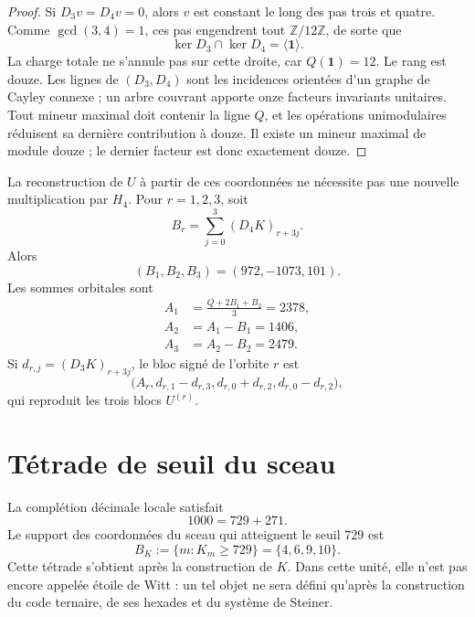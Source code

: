 \begin{proof}
Si \(D_3v=D_4v=0\), alors \(v\) est constant le long des pas
trois et quatre. Comme \(\gcd(3,4)=1\), ces pas engendrent tout
\(\mathbb Z/12\mathbb Z\), de sorte que
\[
 \ker D_3\cap\ker D_4=\langle\mathbf1\rangle.
\]
La charge totale ne s’annule pas sur cette droite, car \(Q(\mathbf1)=12\). Le rang
est douze. Les lignes de \((D_3,D_4)\) sont les incidences orientées d’un graphe
de Cayley connexe ; un arbre couvrant apporte onze facteurs invariants
unitaires. Tout mineur maximal doit contenir la ligne \(Q\), et les opérations
unimodulaires réduisent sa dernière contribution à douze. Il existe un mineur maximal de
module douze ; le dernier facteur est donc exactement douze.
\end{proof}

La reconstruction de \(U\) à partir de ces coordonnées ne nécessite pas une nouvelle multiplication par \(H_4\). Pour \(r=1,2,3\), soit
\begin{equation}
 B_r=\sum_{j=0}^{3}(D_4K)_{r+3j}.
 \label{eq:br-diferencias-k}
\end{equation}
Alors
\[
 (B_1,B_2,B_3)=(972,-1073,101).
\]
Les sommes orbitales sont
\begin{align}
 A_1&=\frac{Q+2B_1+B_2}{3}=2378,
 \label{eq:a1-reconstruccion-u}\\
 A_2&=A_1-B_1=1406,
 \label{eq:a2-reconstruccion-u}\\
 A_3&=A_2-B_2=2479.
 \label{eq:a3-reconstruccion-u}
\end{align}
Si \(d_{r,j}=(D_3K)_{r+3j}\), le bloc signé de l'orbite \(r\) est
\begin{equation}
 \bigl(A_r,
 d_{r,1}-d_{r,3},
 d_{r,0}+d_{r,2},
 d_{r,0}-d_{r,2}\bigr),
 \label{eq:bloque-firmado-desde-diferencias}
\end{equation}
qui reproduit les trois blocs \(U^{(r)}\).

\section{Tétrade de seuil du sceau}

La complétion décimale locale satisfait
\[
 1000=729+271.
\]
Le support des coordonnées du sceau qui atteignent le seuil \(729\) est
\begin{equation}
 \boxed{
 B_K:=\{m:K_m\geq729\}=\{4,6,9,10\}.}
 \label{eq:tetrada-umbral-k}
\end{equation}
Cette tétrade s’obtient après la construction de \(K\). Dans cette unité, elle n’est pas
encore appelée étoile de Witt : un tel objet ne sera défini qu’après
la construction du code ternaire, de ses hexades et du système de Steiner.

